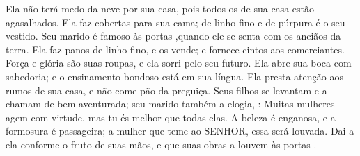 {Ela não terá medo da neve por sua casa, pois todos os de sua casa estão agasalhados.
Ela faz cobertas para sua cama; de linho fino e de púrpura é o seu vestido.
Seu marido é famoso às portas
{} ,quando ele se senta com os anciãos da terra.
Ela faz panos de linho fino, e os vende; e fornece cintos aos comerciantes.
Força e glória são suas roupas, e ela sorri pelo seu futuro.
Ela abre sua boca com sabedoria; e o ensinamento bondoso está em sua língua.
Ela presta atenção aos rumos de sua casa, e não come pão da preguiça.
Seus filhos se levantam e a chamam de bem-aventurada; seu marido também a elogia,
{} :
Muitas mulheres agem com virtude, mas tu és melhor que todas elas.
A beleza é enganosa, e a formosura é passageira;
{} a mulher que teme ao SENHOR, essa será louvada.
Dai a ela conforme o fruto de suas mãos, e que suas obras a louvem às portas
{} .\par }